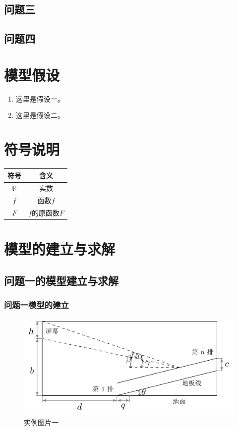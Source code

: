 \documentclass{my_cumcmthesis}
\begin{document}
\subsection{问题三}
    \zhlipsum[3-4] %
\subsection{问题四}
    \zhlipsum[5] %

\section{模型假设}
\begin{enumerate}
    \item 这里是假设一。
    \item 这里是假设二。
\end{enumerate}

\section{符号说明}
\begin{center}\begin{tabular}{cc}
    \toprule
    符号 & 含义 \\
    \midrule
    $\mathbb{R}$ & 实数 \\
    $f$ & 函数$f$ \\
    $F$ & $f$的原函数$F$ \\
    \bottomrule
\end{tabular}\end{center}

\section{模型的建立与求解}
\subsection{问题一的模型建立与求解}
\subsubsection{问题一模型的建立}
    \zhlipsum[6-7] %
    \begin{figure}[hbp]
        \centering
        \includegraphics{source/影院纵向剖面示意图.pdf}
        \caption{实例图片一}
        \label{fig:eg1}
    \end{figure}
    \zhlipsum[8] %
\end{document}
